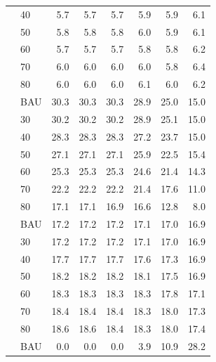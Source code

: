 \documentclass[]{article}
\begin{document}
\begin{longtable}{>{\raggedright\arraybackslash}p{2 cm}lrrrrrr}
\rowcolor{gray!6}   & 40 & 5.7 & 5.7 & 5.7 & 5.9 & 5.9 & 6.1\\

 & 50 & 5.8 & 5.8 & 5.8 & 6.0 & 5.9 & 6.1\\

\rowcolor{gray!6}   & 60 & 5.7 & 5.7 & 5.7 & 5.8 & 5.8 & 6.2\\

 & 70 & 6.0 & 6.0 & 6.0 & 6.0 & 5.8 & 6.4\\

\rowcolor{gray!6}  \multirow{-7}{2 cm}{\raggedright\arraybackslash Hydro} & 80 & 6.0 & 6.0 & 6.0 & 6.1 & 6.0 & 6.2\\
\cmidrule{1-8}
 & BAU & 30.3 & 30.3 & 30.3 & 28.9 & 25.0 & 15.0\\

\rowcolor{gray!6}   & 30 & 30.2 & 30.2 & 30.2 & 28.9 & 25.1 & 15.0\\

 & 40 & 28.3 & 28.3 & 28.3 & 27.2 & 23.7 & 15.0\\

\rowcolor{gray!6}   & 50 & 27.1 & 27.1 & 27.1 & 25.9 & 22.5 & 15.4\\

 & 60 & 25.3 & 25.3 & 25.3 & 24.6 & 21.4 & 14.3\\

\rowcolor{gray!6}   & 70 & 22.2 & 22.2 & 22.2 & 21.4 & 17.6 & 11.0\\

\multirow{-7}{2 cm}{\raggedright\arraybackslash Natural Gas} & 80 & 17.1 & 17.1 & 16.9 & 16.6 & 12.8 & 8.0\\
\cmidrule{1-8}
\rowcolor{gray!6}   & BAU & 17.2 & 17.2 & 17.2 & 17.1 & 17.0 & 16.9\\

 & 30 & 17.2 & 17.2 & 17.2 & 17.1 & 17.0 & 16.9\\

\rowcolor{gray!6}   & 40 & 17.7 & 17.7 & 17.7 & 17.6 & 17.3 & 16.9\\

 & 50 & 18.2 & 18.2 & 18.2 & 18.1 & 17.5 & 16.9\\

\rowcolor{gray!6}   & 60 & 18.3 & 18.3 & 18.3 & 18.3 & 17.8 & 17.1\\

 & 70 & 18.4 & 18.4 & 18.4 & 18.3 & 18.0 & 17.3\\

\rowcolor{gray!6}  \multirow{-7}{2 cm}{\raggedright\arraybackslash Nuclear} & 80 & 18.6 & 18.6 & 18.4 & 18.3 & 18.0 & 17.4\\
\cmidrule{1-8}
 & BAU & 0.0 & 0.0 & 0.0 & 3.9 & 10.9 & 28.2\\


\end{longtable}
\end{document}
